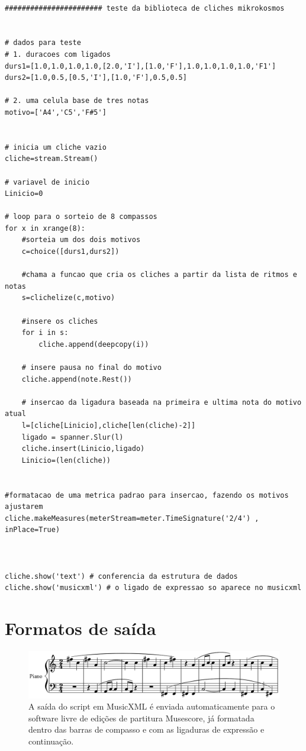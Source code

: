 \documentclass[
	12pt,				%
	openright,			%
	twoside,			%
	a4paper,			%
	english,			%
	french,				%
	spanish,			%
	brazil				%
	]{abntex2}
\begin{document}
\begin{lstlisting}

####################### teste da biblioteca de cliches mikrokosmos


# dados para teste
# 1. duracoes com ligados
durs1=[1.0,1.0,1.0,1.0,[2.0,'I'],[1.0,'F'],1.0,1.0,1.0,1.0,'F1']
durs2=[1.0,0.5,[0.5,'I'],[1.0,'F'],0.5,0.5]

# 2. uma celula base de tres notas
motivo=['A4','C5','F#5']


# inicia um cliche vazio
cliche=stream.Stream()

# variavel de inicio 
Linicio=0

# loop para o sorteio de 8 compassos
for x in xrange(8):
	#sorteia um dos dois motivos
	c=choice([durs1,durs2])

	#chama a funcao que cria os cliches a partir da lista de ritmos e notas
	s=clichelize(c,motivo)
	
	#insere os cliches
	for i in s:
		cliche.append(deepcopy(i))

	# insere pausa no final do motivo
	cliche.append(note.Rest())	
	
	# insercao da ligadura baseada na primeira e ultima nota do motivo atual
	l=[cliche[Linicio],cliche[len(cliche)-2]]
	ligado = spanner.Slur(l)
	cliche.insert(Linicio,ligado)
	Linicio=(len(cliche))
	
	
#formatacao de uma metrica padrao para insercao, fazendo os motivos ajustarem
cliche.makeMeasures(meterStream=meter.TimeSignature('2/4') , inPlace=True)
	


cliche.show('text') # conferencia da estrutura de dados
cliche.show('musicxml') # o ligado de expressao so aparece no musicxml
\end{lstlisting}


\section{Formatos de saída}
\label{saidapartituras}


\begin{figure}[!h]
	\caption{\label{fig_grafico}A saída do script em MusicXML é enviada automaticamente para o software livre de edições de partitura Musescore, já formatada dentro das barras de compasso e com as ligaduras de expressão e continuação. }
	\begin{center}
	    \includegraphics[scale=0.4]{score/clichelib_musescore.png}
	\end{center}
\end{figure}
\end{document}
